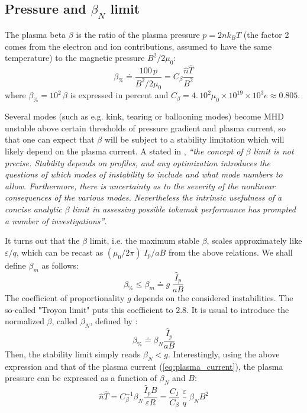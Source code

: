 \documentclass[12pt]{iopart}
\begin{document}
\subsection{Pressure and $\beta_N$ limit} \label{subsec:pressure_betaN}

The plasma beta $\beta$ is the ratio of the plasma pressure $p=2nk_BT$ (the factor 2 comes from the electron and ion contributions, assumed to have the same temperature) to the magnetic pressure $B^2/2\mu_0$:
\begin{equation}
\beta_\% \doteq \frac{100\, p}{B^2/2\mu_0}
	= C_\beta \frac{\widehat n \widehat T}{B^2}
\label{eqn:beta}
\end{equation}
where $\beta_\%=10^2\, \beta$ is expressed in percent and $C_\beta = 4.\,10^2\mu_0\times 10^{19}\times 10^3 e \approx 0.805$.

Several modes (such as e.g. kink, tearing or ballooning modes) become MHD unstable above certain thresholds of pressure gradient and plasma current, so that one can expect that $\beta$ will be subject to a stability limitation which will likely depend on the plasma current. A stated in \cite{Wesson2004}, \emph{``the concept of $\beta$ limit is not precise. Stability depends on profiles, and any optimization introduces the questions of which modes of instability to include and what mode numbers to allow. Furthermore, there is uncertainty as to the severity of the nonlinear consequences of the various modes. Nevertheless the intrinsic usefulness of a concise analytic $\beta$ limit in assessing possible tokamak performance has prompted a number of investigations''}.

It turns out that the $\beta$ limit, i.e. the maximum stable $\beta$, scales approximately like $\varepsilon/q$, which can be recast as $(\mu_0/2\pi)\; I_p/aB$ from the above relations. We shall define $\beta_m$ as follows:
\begin{equation*}
\beta_\% \leqslant \beta_m \doteq g\; \frac{\widehat I_p}{a B}
\end{equation*}
The coefficient of proportionality $g$ depends on the considered instabilities. The so-called "Troyon limit" \cite{Troyon1984} puts this coefficient to $2.8$.
It is usual to introduce the normalized $\beta$, called $\beta_N$, defined by \cite[eq.(13.146)]{Freidberg2007}:
\begin{equation}
\beta_\% \doteq \beta_N \frac{\widehat I_p}{a B}
\end{equation}
Then, the stability limit simply reads $\beta_N <g$.
Interestingly, using the above expression and that of the plasma current (\ref{eq:plasma_current}), the plasma pressure can be expressed as a function of $\beta_N$ and $B$:
\begin{equation}
\widehat n\widehat T 
 = C_\beta^{-1} \beta_N \frac{\widehat I_p B}{\varepsilon R} 
 = \frac{C_I}{C_\beta}\; \frac{\varepsilon}{q} \;  \beta_N B^2
\label{eq:nT_betaN}
\end{equation}
\end{document}
